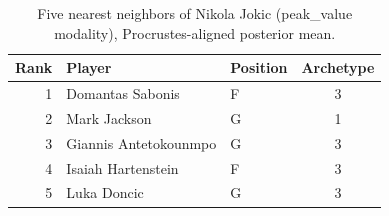 \begin{table}[htbp]
  \centering\small
  \begin{tabular}{rllc}
    \toprule
    Rank & Player & Position & Archetype \\
    \midrule
    1 & Domantas Sabonis & F & 3 \\
    2 & Mark Jackson & G & 1 \\
    3 & Giannis Antetokounmpo & G & 3 \\
    4 & Isaiah Hartenstein & F & 3 \\
    5 & Luka Doncic & G & 3 \\
    \bottomrule
  \end{tabular}
  \caption{Five nearest neighbors of Nikola Jokic (peak_value modality), Procrustes-aligned posterior mean.}
  \label{tab:Nikola_Jokic_neighbors_peak_value}
\end{table}

